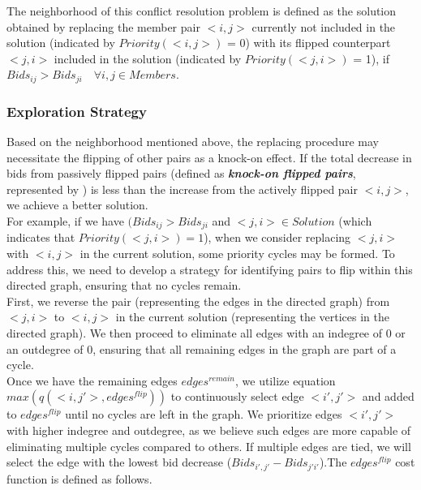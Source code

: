 \documentclass{article}
\begin{document}
The neighborhood of this conflict resolution problem is defined as the solution obtained by replacing the member pair $<i,j>$ currently not included in the solution (indicated by $Priority(<i,j>)$ = 0) with its flipped counterpart $<j,i>$ included in the solution (indicated by $Priority(<j,i>)$ = 1), if $Bids_{ij} > Bids_{ji} \quad \forall i,j \in Members$.

\subsubsection{Exploration Strategy}

Based on the neighborhood mentioned above, the replacing procedure may necessitate the flipping of other pairs as a knock-on effect. If the total decrease in bids from passively flipped pairs (defined as \textbf{\textit{knock-on flipped pairs}}, represented by ) is less than the increase from the actively flipped pair $<i,j>$, we achieve a better solution.\\
For example, if we have $(Bids_{ij} > Bids_{ji}$ and $<j,i> \in Solution$ (which indicates that $Priority(<j,i>) = 1$), when we consider replacing $<j,i>$ with $<i,j>$ in the current solution, some priority cycles may be formed. To address this, we need to develop a strategy for identifying pairs to flip within this directed graph, ensuring that no cycles remain.\\
First, we reverse the pair (representing the edges in the directed graph) from $<j, i>$ to $<i, j>$ in the current solution (representing the vertices in the directed graph). We then proceed to eliminate all edges with an indegree of 0 or an outdegree of 0, ensuring that all remaining edges in the graph are part of a cycle.\\
Once we have the remaining edges $edges^{remain}$, we utilize equation $max(q(<i,j'>, edges^{flip}))$ to continuously select edge $<i',j'>$ and added to $edges^{flip}$ until no cycles are left in the graph. We prioritize edges $<i', j'>$ with higher indegree and outdegree, as we believe such edges are more capable of eliminating multiple cycles compared to others. If multiple edges are tied, we will select the edge with the lowest bid decrease ($Bids_{i',j'} - Bids_{j'i'}$).The $edges^{flip}$ cost function is defined as follows.\\
\newpage
\end{document}
